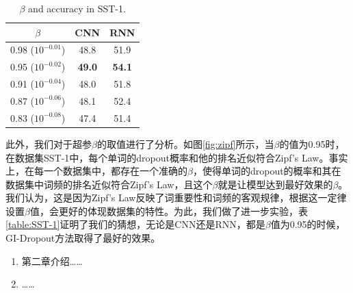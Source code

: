\begin{table}[!t]
\centering
\begin{tabular}{c | c c}
\hline
\bfseries $\beta$ & CNN &  RNN\\
\hline
0.98 ($10^{-0.01}$) & 48.8 & 51.9 \\
0.95 ($10^{-0.02}$) & \textbf{49.0} & \textbf{54.1} \\
0.91 ($10^{-0.04}$) & 48.0 & 51.8 \\
0.87 ($10^{-0.06}$) & 48.1 & 52.4 \\
0.83 ($10^{-0.08}$) & 47.4 & 51.4 \\

\hline
\hline
\end{tabular}
\caption{$\beta$ and accuracy in SST-1. }
\label{table: SST-1}
\end{table}

此外，我们对于超参$\beta$的取值进行了分析。如图\ref{fig:zipf}所示，当$\beta$的值为0.95时，在数据集SST-1中，每个单词的dropout概率和他的排名近似符合Zipf's Law。事实上，在每一个数据集中，都存在一个准确的$\beta$，使得单词的dropout的概率和其在数据集中词频的排名近似符合Zipf's Law，且这个$\beta$就是让模型达到最好效果的$\beta$。我们认为，这是因为Zipf's Law反映了词重要性和词频的客观规律，根据这一定律设置$\beta$值，会更好的体现数据集的特性。为此，我们做了进一步实验，表\ref{table:SST-1}证明了我们的猜想，无论是CNN还是RNN，都是$\beta$值为0.95的时候，GI-Dropout方法取得了最好的效果。


\begin{enumerate}
\item 第二章介绍……
\item ……
\end{enumerate}

\chapterbib

